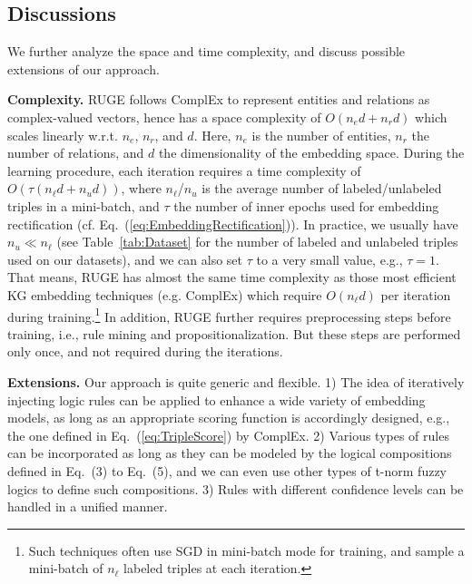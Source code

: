 \documentclass[letterpaper]{article} \usepackage{aaai18}  \usepackage{times}  \usepackage{helvet}  \usepackage{courier}  \usepackage{url}  \usepackage{graphicx}  \usepackage{amsmath}
\begin{document}
\subsection{Discussions}
We further analyze the space and time complexity, and discuss possible extensions of our approach.

\smallskip
\noindent\textbf{Complexity.} RUGE follows ComplEx to represent entities and relations as complex-valued vectors, hence has a space complexity of $O(n_e d + n_r d)$ which scales linearly w.r.t. $n_e$, $n_r$, and $d$. Here, $n_e$ is the number of entities, $n_r$ the number of relations, and $d$ the dimensionality of the embedding space. During the learning procedure, each iteration requires a time complexity of $O(\tau(n_\ell d + n_u d))$, where $n_\ell$/$n_u$ is the average number of labeled/unlabeled triples in a mini-batch, and $\tau$ the number of inner epochs used for embedding rectification (cf. Eq.~(\ref{eq:EmbeddingRectification})). In practice, we usually have $n_u \ll n_\ell$ (see Table~\ref{tab:Dataset} for the number of labeled and unlabeled triples used on our datasets), and we can also set $\tau$ to a very small value, e.g., $\tau=1$. That means, RUGE has almost the same time complexity as those most efficient KG embedding techniques (e.g. ComplEx) which require $O(n_\ell d)$ per iteration during training.\footnote{Such techniques often use SGD in mini-batch mode for training, and sample a mini-batch of $n_\ell$ labeled triples at each iteration.} In addition, RUGE further requires preprocessing steps before training, i.e., rule mining and propositionalization. But these steps are performed only once, and not required during the iterations.

\smallskip
\noindent\textbf{Extensions.} Our approach is quite generic and flexible. 1) The idea of iteratively injecting logic rules can be applied to enhance a wide variety of embedding models, as long as an appropriate scoring function is accordingly designed, e.g., the one defined in Eq.~(\ref{eq:TripleScore}) by ComplEx. 2) Various types of rules can be incorporated as long as they can be modeled by the logical compositions defined in Eq.~(3) to Eq.~(5), and we can even use other types of t-norm fuzzy logics to define such compositions. 3) Rules with different confidence levels can be handled in a unified manner.
\end{document}
